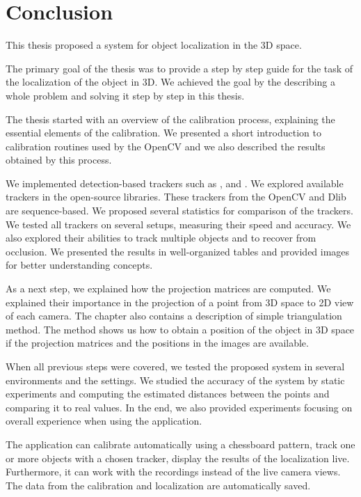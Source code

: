 \chapter*{Conclusion}

This thesis proposed a system for object localization in the 3D space.

The primary goal of the thesis was to provide a step by step guide for the task
of the localization of the object in 3D. We achieved the goal by the describing
a whole problem and solving it step by step in this thesis.

The thesis started with an overview of the calibration process, explaining the
essential elements of the calibration. We presented a short introduction to
calibration routines used by the OpenCV and we also described the results
obtained by this process.

We implemented detection-based trackers such as \simback{}, \hsv{} and \patt{}. We
explored available trackers in the open-source libraries. These trackers from
the OpenCV and Dlib are sequence-based. We proposed several statistics for
comparison of the trackers. We tested all trackers on several setups, measuring their
speed and accuracy. We also explored their abilities to track multiple objects
and to recover from occlusion. We presented the results in 
well-organized tables and provided images for better understanding concepts.

As a next step, we explained how the projection matrices are computed. We
explained their importance in the projection of a point from 3D space to 2D
view of each camera. The chapter also contains a description of simple
triangulation method.  The method shows us how to obtain a position of the
object in 3D space if the projection matrices and the positions in the images
are available.

When all previous steps were covered, we tested the proposed system in several
environments and the settings. We studied the accuracy of the system by static
experiments and computing the estimated distances between the points and
comparing it to real values. In the end, we also provided experiments focusing
on overall experience when using the application.

The application can calibrate automatically using a chessboard pattern, track
one or more objects with a chosen tracker, display the results of the localization
live. Furthermore, it can work with the recordings instead of the live camera views.
The data from the calibration and localization are automatically saved.

